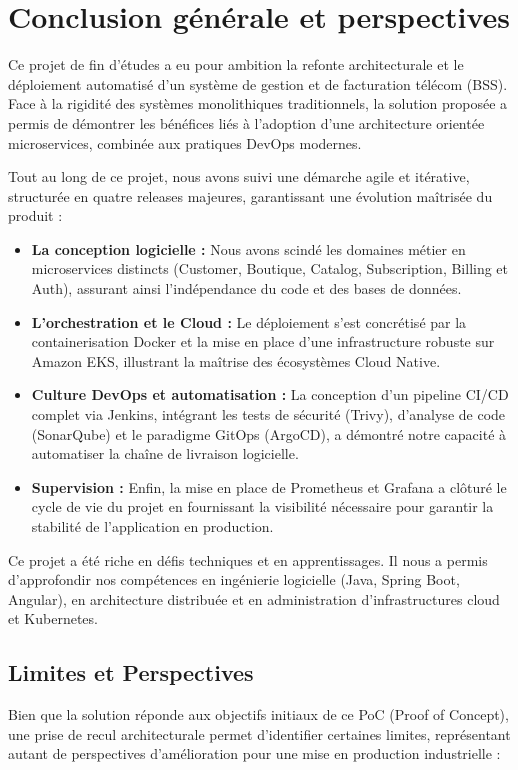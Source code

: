 \section*{Conclusion générale et perspectives}

Ce projet de fin d'études a eu pour ambition la refonte architecturale et le déploiement automatisé d'un système de gestion et de facturation télécom (BSS). Face à la rigidité des systèmes monolithiques traditionnels, la solution proposée a permis de démontrer les bénéfices liés à l'adoption d'une architecture orientée microservices, combinée aux pratiques DevOps modernes.

Tout au long de ce projet, nous avons suivi une démarche agile et itérative, structurée en quatre releases majeures, garantissant une évolution maîtrisée du produit :
\begin{itemize}
    \item \textbf{La conception logicielle :} Nous avons scindé les domaines métier en microservices distincts (Customer, Boutique, Catalog, Subscription, Billing et Auth), assurant ainsi l'indépendance du code et des bases de données.
    \item \textbf{L'orchestration et le Cloud :} Le déploiement s'est concrétisé par la containerisation Docker et la mise en place d'une infrastructure robuste sur Amazon EKS, illustrant la maîtrise des écosystèmes Cloud Native.
    \item \textbf{Culture DevOps et automatisation :} La conception d'un pipeline CI/CD complet via Jenkins, intégrant les tests de sécurité (Trivy), d'analyse de code (SonarQube) et le paradigme GitOps (ArgoCD), a démontré notre capacité à automatiser la chaîne de livraison logicielle.
    \item \textbf{Supervision :} Enfin, la mise en place de Prometheus et Grafana a clôturé le cycle de vie du projet en fournissant la visibilité nécessaire pour garantir la stabilité de l'application en production.
\end{itemize}

Ce projet a été riche en défis techniques et en apprentissages. Il nous a permis d'approfondir nos compétences en ingénierie logicielle (Java, Spring Boot, Angular), en architecture distribuée et en administration d'infrastructures cloud et Kubernetes.

\subsection*{Limites et Perspectives}
Bien que la solution réponde aux objectifs initiaux de ce PoC (Proof of Concept), une prise de recul architecturale permet d'identifier certaines limites, représentant autant de perspectives d'amélioration pour une mise en production industrielle :

